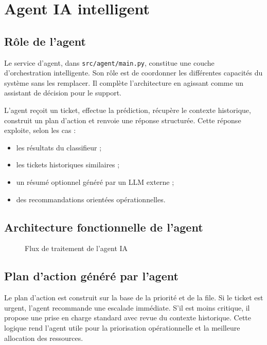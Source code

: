 \documentclass[11pt,a4paper]{report}
\begin{document}
\chapter{Agent IA intelligent}
\section{Rôle de l’agent}
Le service d’agent, dans \texttt{src/agent/main.py}, constitue une couche d’orchestration intelligente. Son rôle est de coordonner les différentes capacités du système sans les remplacer. Il complète l’architecture en agissant comme un assistant de décision pour le support.

L’agent reçoit un ticket, effectue la prédiction, récupère le contexte historique, construit un plan d’action et renvoie une réponse structurée. Cette réponse exploite, selon les cas :
\begin{itemize}[leftmargin=1.3em]
    \item les résultats du classifieur ;
    \item les tickets historiques similaires ;
    \item un résumé optionnel généré par un LLM externe ;
    \item des recommandations orientées opérationnelles.
\end{itemize}

\section{Architecture fonctionnelle de l’agent}
\begin{figure}[H]
\centering
{}
\caption{Flux de traitement de l’agent IA}
\end{figure}

\section{Plan d’action généré par l’agent}
Le plan d’action est construit sur la base de la priorité et de la file. Si le ticket est urgent, l’agent recommande une escalade immédiate. S’il est moins critique, il propose une prise en charge standard avec revue du contexte historique. Cette logique rend l’agent utile pour la priorisation opérationnelle et la meilleure allocation des ressources.
\end{document}
